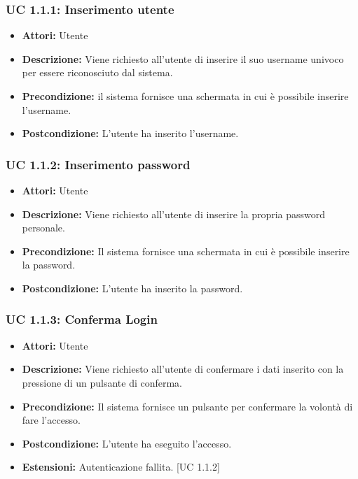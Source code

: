 \subsubsection{UC 1.1.1: Inserimento utente}

\begin{itemize}
\item \textbf{Attori:} Utente
\item \textbf{Descrizione:} Viene richiesto all'utente di inserire il suo username univoco per essere riconosciuto dal sistema. 
\item \textbf{Precondizione:} il sistema fornisce una schermata in cui è possibile inserire l’username.
\item \textbf{Postcondizione:} L'utente ha inserito l'username.
\end{itemize}

\subsubsection{UC 1.1.2: Inserimento password}

\begin{itemize}
\item \textbf{Attori:} Utente
\item \textbf{Descrizione:} Viene richiesto all'utente di inserire la propria password personale.
\item \textbf{Precondizione:} Il sistema fornisce una schermata in cui è possibile inserire la password.
\item \textbf{Postcondizione:} L'utente ha inserito la password.
\end{itemize}

\subsubsection{UC 1.1.3: Conferma Login}

\begin{itemize}
\item \textbf{Attori:} Utente
\item \textbf{Descrizione:} Viene richiesto all'utente di confermare i dati inserito con la pressione di un pulsante di conferma.
\item \textbf{Precondizione:} Il sistema fornisce un pulsante per confermare la volontà di fare l'accesso.
\item \textbf{Postcondizione:} L'utente ha eseguito l'accesso.
\item \textbf{Estensioni:} Autenticazione fallita. [UC 1.1.2] 
\end{itemize}

